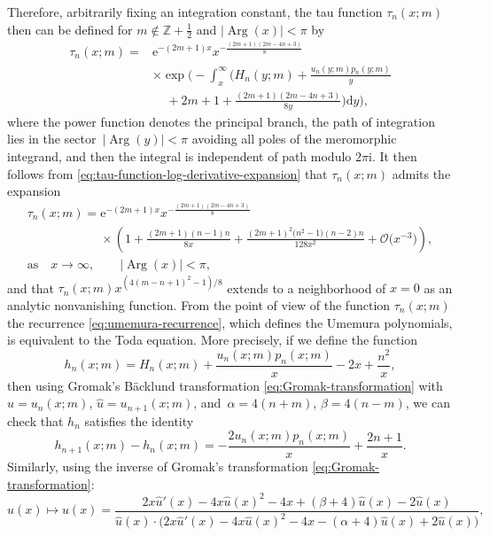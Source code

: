 \documentclass[pdftex]{sigma}
\numberwithin{equation}{section}
\newcommand{\ee}{\mathrm{e}}
\newcommand{\dd}{\mathrm{d}}
\newcommand{\ii}{\mathrm{i}}
\renewcommand{\arg}{\operatorname{Arg}}
\begin{document}
Therefore, arbitrarily fixing an integration constant, the tau function $\tau_n(x;m)$ then can be defined for $m\not\in\mathbb{Z}+\frac{1}{2}$ and $|{\arg}(x)|<\pi$ by
\begin{align}
\tau_n(x;m)={}&\ee^{- (2 m+1)x}x^{-\frac{(2 m+1) (2 m-4 n+3)}{8 }}\nonumber\\
&\times \exp\biggl(-\int_x^\infty\biggl( H_n(y;m)+\frac{u_n(y;m)p_n(y;m)}{y}\nonumber\\
&\phantom{\times}{}+2m+1+\frac{(2 m+1) (2 m-4 n+3)}{8 y}\biggr) \dd y\biggr),
\label{eq:tau-def-infinity}
\end{align}
where the power function denotes the principal branch, the path of integration lies in the sector~$|{\arg}(y)|<\pi$ avoiding all poles of the meromorphic integrand, and then the integral is independent of path modulo $2\pi\ii$. It then follows from \eqref{eq:tau-function-log-derivative-expansion} that $\tau_n(x;m)$ admits the expansion
\begin{gather}
\tau_n(x;m)=\ee^{- (2 m+1)x}x^{-\frac{(2 m+1) (2 m-4 n+3)}{8 }}\nonumber\\
 \phantom{\tau_n(x;m)=}{}\times \left(1+\frac{(2m+1)(n-1)n}{8x}+\frac{(2m+1)^2\big(n^2-1\big)(n-2)n}{128x^2}+\mathcal{O}\big(x^{-3}\big)\right),\nonumber \\
 \text{as} \quad x\to \infty,\qquad|{\arg}(x)|<\pi,\label{eq:tau_asym}
\end{gather}
and that $\tau_n(x;m)x^{(4(m-n+1)^2-1)/8}$ extends to a neighborhood of $x=0$ as an analytic nonvanishing function.
From the point of view of the function $\tau_n(x;m)$ the recurrence \eqref{eq:umemura-recurrence}, which defines the Umemura polynomials, is equivalent to the Toda equation. More precisely, if we define the function \begin{equation}\label{eq:hn-def}
h_n(x;m)=H_n(x;m)+\frac{u_n(x;m)p_n(x;m)}{x}-2x+\frac{n^2}{x},\end{equation}
then using Gromak's B\"acklund transformation \eqref{eq:Gromak-transformation} with $u=u_n(x;m)$, $\hat{u}=u_{n+1}(x;m)$, and~${\alpha=4(n+m)}$, $\beta=4(n-m)$, we can check that $h_n$ satisfies the identity
\begin{equation}\label{eq:first-hn}
 h_{n+1}(x;m)-h_n(x;m)=-\frac{2u_n(x;m)p_n(x;m)}{x}+\frac{2n+1}{x}.
\end{equation}
Similarly, using the inverse of Gromak's transformation \eqref{eq:Gromak-transformation}:
\begin{equation*}
 \hat{u}(x) \mapsto u(x) =\dfrac{2x\hat{u}'(x) -4x\hat{u}(x)^2 -4x +(\beta+4) \hat{u}(x) - 2\hat{u}(x)}{\hat{u}(x) \cdot \big( 2x\hat{u}'(x) - 4x \hat{u}(x)^2 -4x - (\alpha+4) \hat{u}(x) + 2\hat{u}(x)\big)},
\end{equation*}
\end{document}
